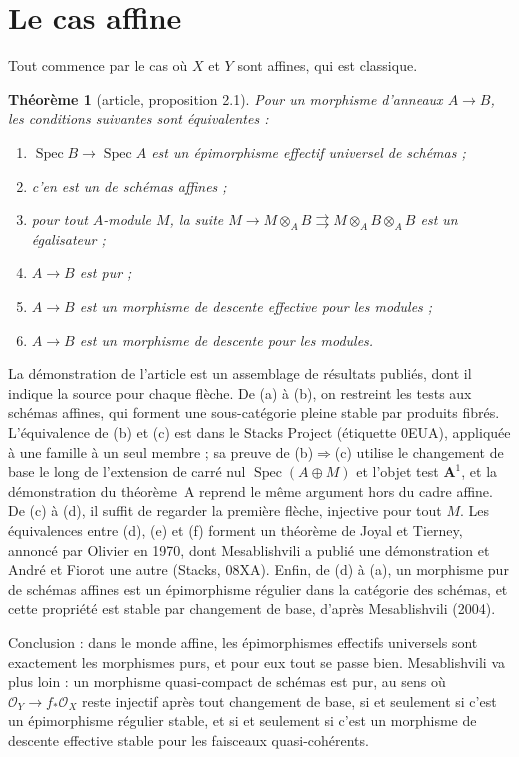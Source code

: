 \documentclass[11pt,a4paper]{amsart}
\theoremstyle{definition}
\theoremstyle{plain}
\newtheorem{theoreme}{Théorème}
\theoremstyle{remark}
\newcommand{\Spec}{\operatorname{Spec}}
\begin{document}
\section{Le cas affine}

Tout commence par le cas où $X$ et $Y$ sont affines, qui est classique.

\begin{theoreme}[article, proposition 2.1]
Pour un morphisme d'anneaux $A\to B$, les conditions suivantes sont équivalentes :
\begin{enumerate}
\item[(a)] $\Spec B\to\Spec A$ est un épimorphisme effectif universel de schémas ;
\item[(b)] c'en est un de schémas affines ;
\item[(c)] pour tout $A$-module $M$, la suite $M\to M\otimes_AB\rightrightarrows M\otimes_AB\otimes_AB$ est un égalisateur ;
\item[(d)] $A\to B$ est pur ;
\item[(e)] $A\to B$ est un morphisme de descente effective pour les modules ;
\item[(f)] $A\to B$ est un morphisme de descente pour les modules.
\end{enumerate}
\end{theoreme}

La démonstration de l'article est un assemblage de résultats publiés, dont il indique la source pour chaque flèche. De (a) à (b), on restreint les tests aux schémas affines, qui forment une sous-catégorie pleine stable par produits fibrés. L'équivalence de (b) et (c) est dans le Stacks Project (étiquette 0EUA), appliquée à une famille à un seul membre ; sa preuve de (b)$\Rightarrow$(c) utilise le changement de base le long de l'extension de carré nul $\Spec(A\oplus M)$ et l'objet test $\mathbf A^1$, et la démonstration du théorème~A reprend le même argument hors du cadre affine. De (c) à (d), il suffit de regarder la première flèche, injective pour tout $M$. Les équivalences entre (d), (e) et (f) forment un théorème de Joyal et Tierney, annoncé par Olivier en 1970, dont Mesablishvili a publié une démonstration et André et Fiorot une autre (Stacks, 08XA). Enfin, de (d) à (a), un morphisme pur de schémas affines est un épimorphisme régulier dans la catégorie des schémas, et cette propriété est stable par changement de base, d'après Mesablishvili (2004).

Conclusion : dans le monde affine, les épimorphismes effectifs universels sont exactement les morphismes purs, et pour eux tout se passe bien. Mesablishvili va plus loin : un morphisme quasi-compact de schémas est pur, au sens où $\mathcal O_Y\to f_*\mathcal O_X$ reste injectif après tout changement de base, si et seulement si c'est un épimorphisme régulier stable, et si et seulement si c'est un morphisme de descente effective stable pour les faisceaux quasi-cohérents.
\end{document}
